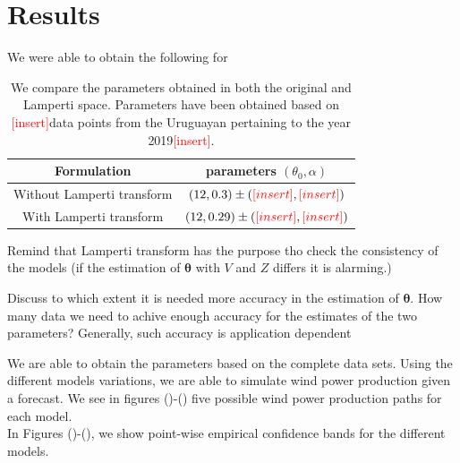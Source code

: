 \documentclass[11pt]{article}
\newcommand{\add}{\textcolor{red}{[insert]}}
\begin{document}
\section{Results} \label{Section_7}

We were able to obtain the following for 
\begin{table}[]
\centering
\begin{tabular}{|c|c|}
\hline
Formulation   &  parameters $(\theta_0, \alpha)$    \\ \hline
Without Lamperti transform &   $(12,0.3) \pm (\add , \add) $   \\ \hline
With Lamperti transform &   $(12,0.29) \pm (\add , \add)  $   \\ \hline
\end{tabular}
\caption{We compare the parameters obtained in both the original and Lamperti space. Parameters have been obtained based on \add data points from the Uruguayan pertaining to the year 2019\add .}
\label{tab:model_comparison_2}
\end{table}

{\color{red} Remind that Lamperti transform has the purpose tho check the consistency of the models (if the estimation of $\bm{\theta}$ with $V$ and $Z$ differs it is alarming.)}

{\color{red} Discuss to which extent it is needed more accuracy in the estimation of $\bm{\theta}$. How many data we need to achive enough accuracy for the estimates of the two parameters? Generally, such accuracy is application dependent}

 We are able to obtain the parameters based on the complete data sets. Using the different models variations, we are able to simulate wind power production given a forecast. We see in figures ()-()
five possible wind power production paths for each model.\\

In Figures ()-(), we show point-wise empirical confidence bands for the different models.
\end{document}
